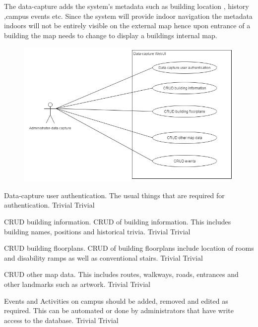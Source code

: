 The data-capture adds the system's metadata such as building location , history ,campus events etc. Since the system will provide indoor navigation the metadata indoors will not be entirely visible on the external map hence upon entrance of a building the map needs to change to display a buildings internal map.
\bigskip

\begin{figure}[h]
  \includegraphics[width=\textwidth]{diagrams/Specific_Requirements/data_capture_WebUI.png}
\end{figure}

\FuncReq
{Data-capture user authentication.}
{The usual things that are required for authentication.}
{Trivial}
{Trivial}

\FuncReq
{CRUD building information.}
{CRUD of building information. This includes building names, positions and historical trivia.}
{Trivial}
{Trivial}

\FuncReq
{CRUD building floorplans.}
{CRUD of building floorplans include location of rooms and disability ramps as well as conventional stairs.}
{Trivial}
{Trivial}

\FuncReq
{CRUD other map data.}
{This includes routes, walkways, roads, entrances and other landmarks such as artwork.}
{Trivial}
{Trivial}
 
{Events and Activities on campus should be added, removed and edited as required. This can be automated or done by administrators that have write access to the database.}
{Trivial}
{Trivial}
